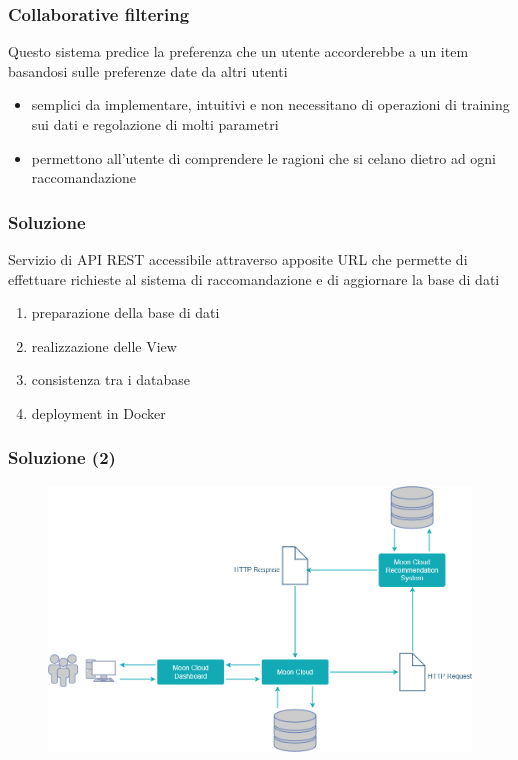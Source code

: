 \begin{frame}
    \frametitle{Collaborative filtering}
    Questo sistema predice la preferenza che un utente accorderebbe a un item basandosi sulle preferenze date da altri utenti
    \begin{itemize}
        \item \alert{semplici da implementare}, \alert{intuitivi} e non necessitano di operazioni di training sui dati e 
        regolazione di molti parametri
        \item permettono all'utente di comprendere le ragioni che si celano dietro ad ogni raccomandazione
    \end{itemize}
\end{frame}

\begin{frame}
    \frametitle{Soluzione}
    Servizio di \alert{API REST} accessibile attraverso apposite URL che permette di effettuare richieste al sistema di 
    raccomandazione e di aggiornare la base di dati
    \begin{enumerate}
        \item preparazione della base di dati
        \item realizzazione delle View
        \item consistenza tra i database
        \item deployment in Docker
    \end{enumerate}
\end{frame}

\begin{frame}
    \frametitle{Soluzione (2)}
    \begin{figure}
        \centering
        \includegraphics[scale=0.42]{images/UML_MoonCloud_HowToDo}
    \end{figure}
\end{frame}

